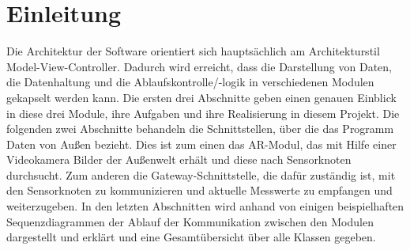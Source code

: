 \section{Einleitung}

Die Architektur der Software orientiert sich hauptsächlich am Architekturstil Model-View-Controller. Dadurch wird erreicht, dass die Darstellung von Daten, die Datenhaltung und die Ablaufskontrolle/-logik in verschiedenen Modulen gekapselt werden kann. Die ersten drei Abschnitte geben einen genauen Einblick in diese drei Module, ihre Aufgaben und ihre Realisierung in diesem Projekt. Die folgenden zwei Abschnitte behandeln die Schnittstellen, über die das Programm Daten von Außen bezieht. Dies ist zum einen das AR-Modul, das mit Hilfe einer Videokamera Bilder der Außenwelt erhält und diese nach Sensorknoten durchsucht. Zum anderen die Gateway-Schnittstelle, die dafür zuständig ist, mit den Sensorknoten zu kommunizieren und aktuelle Messwerte zu empfangen und weiterzugeben. In den letzten Abschnitten wird anhand von einigen beispielhaften Sequenzdiagrammen der Ablauf der Kommunikation zwischen den Modulen dargestellt und erklärt und eine Gesamtübersicht über alle Klassen gegeben.
